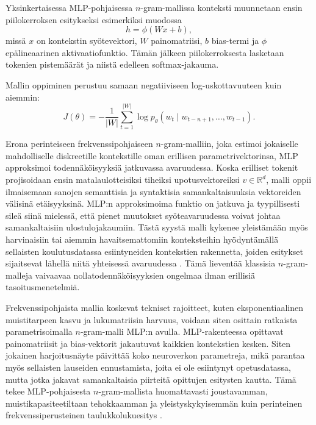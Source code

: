 Yksinkertaisessa MLP-pohjaisessa \(n\)-gram-mallissa konteksti muunnetaan ensin
piilokerroksen esitykseksi esimerkiksi muodossa
\[
  h=\phi(Wx+b),
\]
missä \(x\) on kontekstin syötevektori, \(W\) painomatriisi, \(b\) bias-termi
ja \(\phi\) epälineaarinen aktivaatiofunktio. Tämän jälkeen piilokerroksesta
lasketaan tokenien pistemäärät ja niistä edelleen softmax-jakauma.

Mallin oppiminen perustuu samaan negatiiviseen log-uskottavuuteen kuin aiemmin:
\[
  J(\theta)
  =
  -\frac{1}{|W|}
  \sum_{t=1}^{|W|}
  \log p_\theta(w_t \mid w_{t-n+1}, \ldots, w_{t-1}).
\]

Erona perinteiseen frekvenssipohjaiseen \(n\)-gram-malliin, joka estimoi
jokaiselle mahdolliselle diskreetille kontekstille oman erillisen
parametrivektorinsa, MLP approksimoi todennäköisyyksiä jatkuvassa avaruudessa.
Koska erilliset tokenit projisoidaan ensin matalaulotteisiksi tiheiksi
upotusvektoreiksi \(v \in \mathbb{R}^d\), malli oppii ilmaisemaan sanojen
semanttisia ja syntaktisia samankaltaisuuksia vektoreiden välisinä etäisyyksinä.
MLP:n approksimoima funktio on jatkuva ja tyypillisesti sileä siinä mielessä,
että pienet muutokset syöteavaruudessa voivat johtaa samankaltaisiin
ulostulojakaumiin. Tästä syystä malli kykenee yleistämään myös harvinaisiin tai
aiemmin havaitsemattomiin konteksteihin hyödyntämällä sellaisten
koulutusdatassa esiintyneiden kontekstien rakennetta, joiden esitykset
sijaitsevat lähellä niitä yhteisessä avaruudessa \cite{bengio2003neural}. Tämä
lieventää klassisia \(n\)-gram-malleja vaivaavaa nollatodennäköisyyksien
ongelmaa ilman erillisiä tasoitusmenetelmiä.

Frekvenssipohjaista mallia koskevat tekniset rajoitteet, kuten eksponentiaalinen
muistitarpeen kasvu ja lukumatriisin harvuus, voidaan siten osittain ratkaista
parametrisoimalla \(n\)-gram-malli MLP:n avulla. MLP-rakenteessa opittavat
painomatriisit ja bias-vektorit jakautuvat kaikkien kontekstien kesken. Siten
jokainen harjoitusnäyte päivittää koko neuroverkon parametreja, mikä parantaa
myös sellaisten lauseiden ennustamista, joita ei ole esiintynyt opetusdatassa,
mutta jotka jakavat samankaltaisia piirteitä opittujen esitysten kautta. Tämä
tekee MLP-pohjaisesta \(n\)-gram-mallista huomattavasti joustavamman,
muistikapasiteetiltaan tehokkaamman ja yleistyskykyisemmän kuin perinteinen
frekvenssiperusteinen taulukkolukuesitys
\cite{goodfellow2016deep,jurafsky2023speech}.
